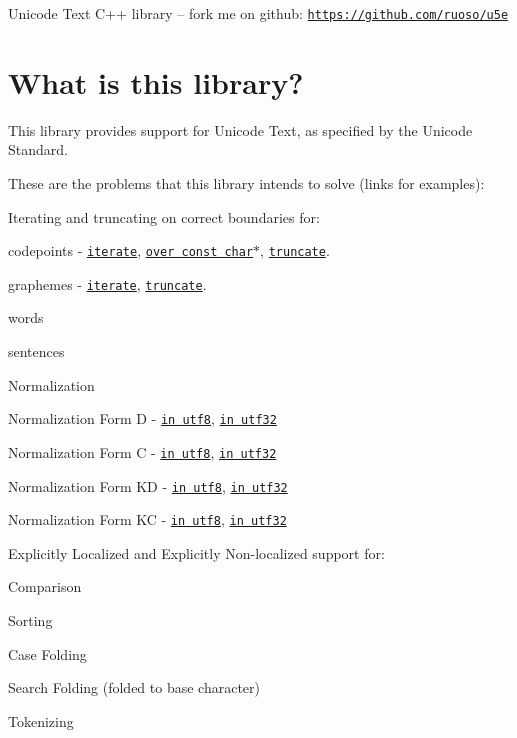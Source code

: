 Unicode Text C++ library -- fork me on github\+: \href{https://github.com/ruoso/u5e}{\tt https\+://github.\+com/ruoso/u5e}

\section*{What is this library?}

This library provides support for Unicode Text, as specified by the Unicode Standard.

These are the problems that this library intends to solve (links for examples)\+:


\begin{DoxyItemize}
\item Iterating and truncating on correct boundaries for\+:
\begin{DoxyItemize}
\item codepoints -\/ \href{simple_iteration.html}{\tt iterate}, \href{smallest_code.html}{\tt over const char$\ast$}, \href{truncate_on_codepoint.html}{\tt truncate}.
\item graphemes -\/ \href{grapheme_iteration.html}{\tt iterate}, \href{truncate_on_grapheme.html}{\tt truncate}.
\item words
\item sentences
\end{DoxyItemize}
\item Normalization
\begin{DoxyItemize}
\item Normalization Form D -\/ \href{normalization_form_d.html}{\tt in utf8}, \href{normalization_form_d_utf32.html}{\tt in utf32}
\item Normalization Form C -\/ \href{normalization_form_c.html}{\tt in utf8}, \href{normalization_form_c_utf32.html}{\tt in utf32}
\item Normalization Form KD -\/ \href{normalization_form_kd.html}{\tt in utf8}, \href{normalization_form_kd_utf32.html}{\tt in utf32}
\item Normalization Form KC -\/ \href{normalization_form_kc.html}{\tt in utf8}, \href{normalization_form_kc_utf32.html}{\tt in utf32}
\end{DoxyItemize}
\item Explicitly Localized and Explicitly Non-\/localized support for\+:
\begin{DoxyItemize}
\item Comparison
\item Sorting
\item Case Folding
\item Search Folding (folded to \textquotesingle{}base character\textquotesingle{})
\item Tokenizing
\end{DoxyItemize}
\end{DoxyItemize}

